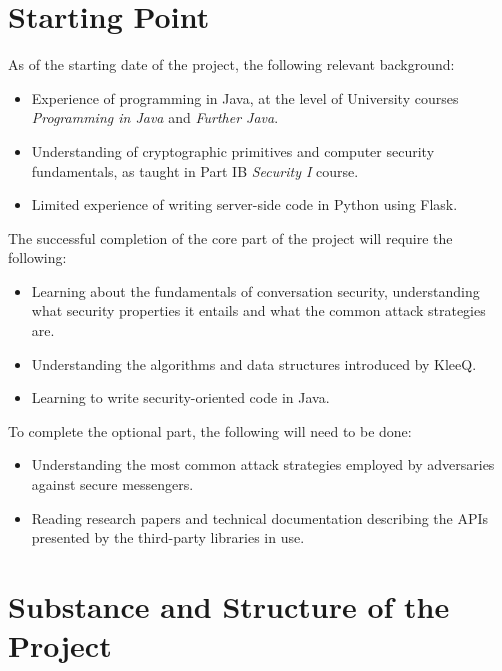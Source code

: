 \documentclass[a4paper, 12pt]{report}
\begin{document}
\begin{appendices}
\section{Starting Point}
As of the starting date of the project, the following relevant background:
\begin{itemize}
    \item Experience of programming in Java, at the level of University courses \emph{Programming in Java} and \emph{Further Java}.
    \item Understanding of cryptographic primitives and computer security fundamentals, as taught in Part IB \emph{Security I} course.
    \item Limited experience of writing server-side code in Python using Flask.
\end{itemize}
\vspace{\baselineskip}


\noindent
The successful completion of the core part of the project will require the following:
\begin{itemize}
    \item Learning about the fundamentals of conversation security, understanding what security properties it entails and what the common attack strategies are.
    \item Understanding the algorithms and data structures introduced by KleeQ.
    \item Learning to write security-oriented code in Java.
\end{itemize}

\noindent
To complete the optional part, the following will need to be done:
\begin{itemize}
    \item Understanding the most common attack strategies employed by adversaries against secure messengers.
    \item Reading research papers and technical documentation describing the APIs presented by the third-party libraries in use.
\end{itemize}


\section{Substance and Structure of the Project}

\end{appendices}
\end{document}
